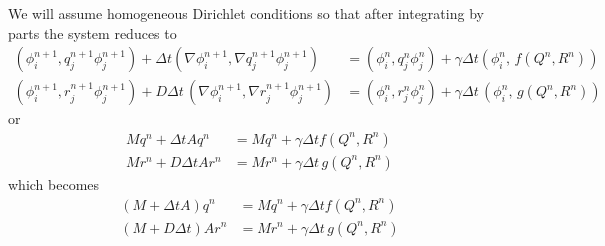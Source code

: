 \documentclass{article}
\begin{document}
We will assume homogeneous Dirichlet conditions so that after integrating by
parts the system reduces to
\begin{align}
    (\phi_i^{n+1}, q_j^{n+1}\phi_j^{n+1}) + \Delta t (\nabla \phi_i^{n+1}, \nabla q_j^{n+1} \phi_j^{n+1})
    &= (\phi_i^{n}, q_j^{n}\phi_j^{n}) + \gamma \Delta t (\phi_i^{n},\, f(Q^{n}, R^{n}))\\
    (\phi_i^{n+1}, r_j^{n+1} \phi_j^{n+1}) + D\Delta t\, (\nabla \phi_i^{n+1},\nabla r_j^{n+1}\phi_j^{n+1})
    &= (\phi_i^n, r_j^{n}\phi_j^{n}) + \gamma \Delta t\, (\phi_i^{n},\, g(Q^{n}, R^{n}))
\end{align}
or
\begin{align}
    Mq^n + \Delta t Aq^n
    &= Mq^{n} + \gamma \Delta t f(Q^{n}, R^{n})\\
    Mr^n + D\Delta t Ar^n
    &= Mr^{n} + \gamma \Delta t\, g(Q^{n}, R^{n})
\end{align}
which becomes
\begin{align}
    (M + \Delta t A)q^n
    &= Mq^{n} + \gamma \Delta t f(Q^{n}, R^{n})\\
    (M + D\Delta t) Ar^n
    &= Mr^{n} + \gamma \Delta t\, g(Q^{n}, R^{n})
\end{align}
\end{document}
